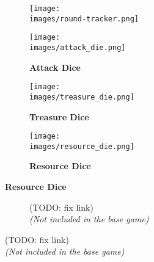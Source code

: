 \begin{figure}[H]
  \centering
  \begin{subfigure}[c]{0.4\linewidth}
    \centering
    \texttt{[image: \\images/round-tracker.png]}
    \caption{\textbf{}}
  \end{subfigure}
  \begin{subfigure}[c]{0.15\linewidth}
    \centering
    \texttt{[image: \\images/attack\_die.png]}
    \caption{\textbf{Attack Dice} \\\phantom{Population}}
  \end{subfigure}
  \begin{subfigure}[c]{0.15\linewidth}
    \centering
    \texttt{[image: \\images/treasure\_die.png]}
    \caption{\textbf{Treasure Dice}}
  \end{subfigure}
  \begin{subfigure}[c]{0.15\linewidth}
    \centering
    \texttt{[image: \\images/resource\_die.png]}
    \caption{\textbf{Resource Dice}}
  \end{subfigure}
\end{figure}

\begin{figure}[H]
  \centering
  \begin{subfigure}[c]{0.9\linewidth}
    \centering
    \caption{\textbf{} (TODO: fix link)\\\textit{(Not included in the base game)}}
  \end{subfigure}
\end{figure}




